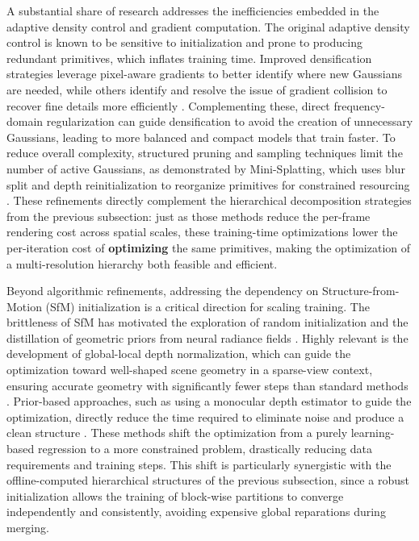 \documentclass[11pt,a4paper]{article}
\begin{document}
A substantial share of research addresses the inefficiencies embedded in the adaptive density control and gradient computation. The original adaptive density control is known to be sensitive to initialization and prone to producing redundant primitives, which inflates training time. Improved densification strategies leverage pixel-aware gradients \cite{arxiv:2403.15530v1} to better identify where new Gaussians are needed, while others identify and resolve the issue of gradient collision to recover fine details more efficiently \cite{arxiv:2404.10484v1}. Complementing these, direct frequency-domain regularization \cite{arxiv:2403.06908v2} can guide densification to avoid the creation of unnecessary Gaussians, leading to more balanced and compact models that train faster. To reduce overall complexity, structured pruning and sampling techniques limit the number of active Gaussians, as demonstrated by Mini-Splatting, which uses blur split and depth reinitialization to reorganize primitives for constrained resourcing \cite{arxiv:2403.14166v1}. These refinements directly complement the hierarchical decomposition strategies from the previous subsection: just as those methods reduce the per-frame rendering cost across spatial scales, these training-time optimizations lower the per-iteration cost of \textbf{optimizing} the same primitives, making the optimization of a multi-resolution hierarchy both feasible and efficient.

Beyond algorithmic refinements, addressing the dependency on Structure-from-Motion (SfM) initialization is a critical direction for scaling training. The brittleness of SfM has motivated the exploration of random initialization and the distillation of geometric priors from neural radiance fields \cite{arxiv:2404.12547v2}. Highly relevant is the development of global-local depth normalization, which can guide the optimization toward well-shaped scene geometry in a sparse-view context, ensuring accurate geometry with significantly fewer steps than standard methods \cite{arxiv:2403.06912v3}. Prior-based approaches, such as using a monocular depth estimator to guide the optimization, directly reduce the time required to eliminate noise and produce a clean structure \cite{arxiv:2312.00451v1}. These methods shift the optimization from a purely learning-based regression to a more constrained problem, drastically reducing data requirements and training steps. This shift is particularly synergistic with the offline-computed hierarchical structures of the previous subsection, since a robust initialization allows the training of block-wise partitions to converge independently and consistently, avoiding expensive global reparations during merging.
\end{document}
